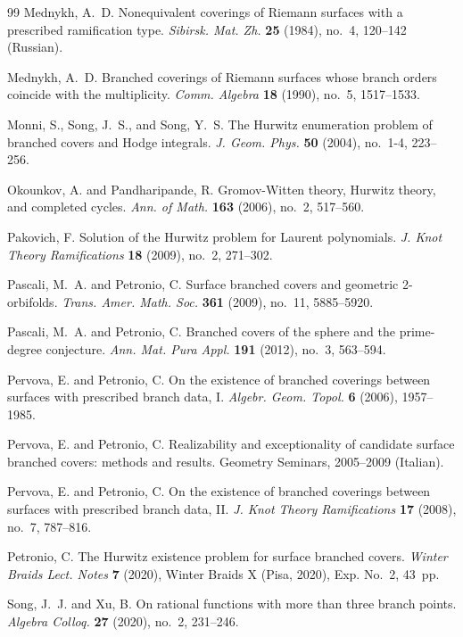 \documentclass[microtype]{gtpart}     %
\theoremstyle{definition}
\begin{document}
\begin{thebibliography}{99}
Mednykh, A.~D.
Nonequivalent coverings of Riemann surfaces with a prescribed ramification type.
\textit{Sibirsk. Mat. Zh.} \textbf{25} (1984), no.~4, 120--142 (Russian).

Mednykh, A.~D.
Branched coverings of Riemann surfaces whose branch orders coincide with the multiplicity.
\textit{Comm. Algebra} \textbf{18} (1990), no.~5, 1517--1533.

Monni, S., Song, J.~S., and Song, Y.~S.
The Hurwitz enumeration problem of branched covers and Hodge integrals.
\textit{J. Geom. Phys.} \textbf{50} (2004), no.~1-4, 223--256.

Okounkov, A. and Pandharipande, R.
Gromov-Witten theory, Hurwitz theory, and completed cycles.
\textit{Ann. of Math.} \textbf{163} (2006), no.~2, 517--560.

Pakovich, F.
Solution of the Hurwitz problem for Laurent polynomials.
\textit{J. Knot Theory Ramifications} \textbf{18} (2009), no.~2, 271--302.

Pascali, M.~A. and Petronio, C.
Surface branched covers and geometric 2-orbifolds.
\textit{Trans. Amer. Math. Soc.} \textbf{361} (2009), no.~11, 5885--5920.

Pascali, M.~A. and Petronio, C.
Branched covers of the sphere and the prime-degree conjecture.
\textit{Ann. Mat. Pura Appl.} \textbf{191} (2012), no.~3, 563--594.

Pervova, E. and Petronio, C.
On the existence of branched coverings between surfaces with prescribed branch data, I.
\textit{Algebr. Geom. Topol.} \textbf{6} (2006), 1957--1985.

Pervova, E. and Petronio, C.
Realizability and exceptionality of candidate surface branched covers: methods and results.
Geometry Seminars, 2005--2009 (Italian).

Pervova, E. and Petronio, C.
On the existence of branched coverings between surfaces with prescribed branch data, II.
\textit{J. Knot Theory Ramifications} \textbf{17} (2008), no.~7, 787--816.

Petronio, C.
The Hurwitz existence problem for surface branched covers.
\textit{Winter Braids Lect. Notes} \textbf{7} (2020), Winter Braids X (Pisa, 2020), Exp. No.~2, 43~pp.

Song, J.~J. and Xu, B.
On rational functions with more than three branch points.
\textit{Algebra Colloq.} \textbf{27} (2020), no.~2, 231--246.


\end{thebibliography}
\end{document}
